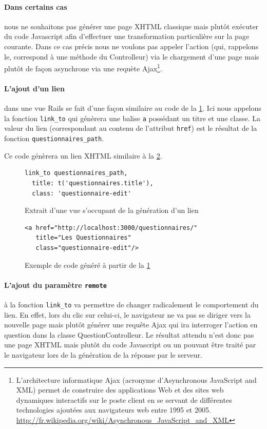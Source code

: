 \documentclass[12pt,a4paper]{book}
\begin{document}
\paragraph{Dans certains cas} nous ne souhaitons pas générer une page XHTML classique mais plutôt exécuter du code Javascript afin d'effectuer une transformation particulière sur la page courante. Dans ce cas précis nous ne voulons pas appeler l'action (qui, rappelons le, correspond à une méthode du Controlleur) via le chargement d'une page mais plutôt de façon asynchrone via une requète Ajax\footnote{L'architecture informatique Ajax (acronyme d'Asynchronous JavaScript and XML) permet de construire des applications Web et des sites web dynamiques interactifs sur le poste client en se servant de différentes technologies ajoutées aux navigateurs web entre 1995 et 2005. \url{http://fr.wikipedia.org/wiki/Asynchronous_JavaScript_and_XML}}. 

\paragraph{L'ajout d'un lien} dans une vue Rails se fait d'une façon similaire au code de la \cref{fig.link}. Ici nous appelons la fonction \texttt{link\_to} qui génèrera une balise \texttt{a} possédant un titre et une classe. La valeur du lien (correspondant au contenu de l'attribut \texttt{href}) est le résultat de la fonction \texttt{questionnaires\_path}.

Ce code génèrera un lien XHTML similaire à la \cref{fig.link2}.

\begin{figure}[h]
\lstset{language=ruby}
\begin{lstlisting}
link_to questionnaires_path, 
  title: t('questionnaires.title'), 
  class: 'questionnaire-edit'
\end{lstlisting}
 \caption{Extrait d'une vue s'occupant de la génération d'un lien}
 \label{fig.link}
\end{figure}

\begin{figure}[h]
\lstset{language=xml}
\begin{lstlisting}
<a href="http://localhost:3000/questionnaires/" 
   title="Les Questionnaires" 
   class="questionnaire-edit"/>
\end{lstlisting}
 \caption{Exemple de code généré à partir de la \cref{fig.link}}
 \label{fig.link2}
\end{figure}

\paragraph{L'ajout du paramètre \texttt{remote}} à la fonction \texttt{link\_to} va permettre de changer radicalement le comportement du lien. En effet, lors du clic sur celui-ci, le navigateur ne va pas se diriger vers la nouvelle page mais plutôt générer une requête Ajax qui ira interroger l'action en question dans la classe QuestionControlleur. Le résultat attendu n'est donc pas une page XHTML mais plutôt du code Javascript ou un pouvant être traité par le navigateur lors de la génération de la réponse par le serveur.
\end{document}
